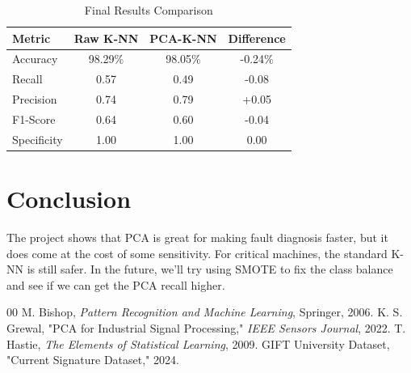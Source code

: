 \documentclass[conference]{IEEEtran}
\begin{document}
\begin{table}[H]
\caption{Final Results Comparison}
\centering
\begin{tabular}{@{}lccc@{}}
\toprule
\textbf{Metric} & \textbf{Raw K-NN} & \textbf{PCA-K-NN} & \textbf{Difference} \\ \midrule
Accuracy        & 98.29\%           & 98.05\%           & -0.24\%             \\
Recall          & 0.57              & 0.49              & -0.08               \\
Precision       & 0.74              & 0.79              & +0.05               \\
F1-Score        & 0.64              & 0.60              & -0.04               \\
Specificity     & 1.00              & 1.00              & 0.00                \\ \bottomrule
\end{tabular}
\end{table}

\section{Conclusion}
The project shows that PCA is great for making fault diagnosis faster, but it does come at the cost of some sensitivity. For critical machines, the standard K-NN is still safer. In the future, we'll try using SMOTE to fix the class balance and see if we can get the PCA recall higher.

\begin{thebibliography}{00}
 M. Bishop, \textit{Pattern Recognition and Machine Learning}, Springer, 2006.
 K. S. Grewal, "PCA for Industrial Signal Processing," \textit{IEEE Sensors Journal}, 2022.
 T. Hastie, \textit{The Elements of Statistical Learning}, 2009.
 GIFT University Dataset, "Current Signature Dataset," 2024.
\end{thebibliography}
\end{document}
